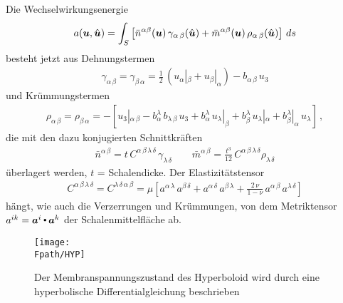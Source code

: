 Die Wechselwirkungsenergie
\begin{align}
a(\mbox{\boldmath $u$},\hat{\mbox{\boldmath $u$}}) = \int_{S} \left[\bar{n}^{\alpha \beta}(\mbox{\boldmath $u$})\,\gamma_{\alpha\,\beta}(\hat{\mbox{\boldmath $u$}}) + \bar{m}^{\alpha \beta}(\mbox{\boldmath $u$})\,\rho_{\alpha\,\beta}(\hat{\mbox{\boldmath $u$}})\right]\,ds
\end{align}
besteht jetzt aus Dehnungstermen
\begin{align}
\gamma_{\alpha\,\beta} = \gamma_{\beta\,\alpha} = \frac{1}{2}\, (u_{\alpha}|_\beta +
u_{\beta}|_\alpha) - b_{\alpha\,\beta}\,u_3
\end{align}
und Kr\"{u}mmungstermen
\begin{align}
\rho_{\alpha\,\beta} = \rho_{\beta\,\alpha} = - \left[u_3|_{\alpha\,\beta} -
b_\alpha^\lambda\,b_{\lambda\,\beta}\,u_3 + b_\alpha^\lambda\,u_\lambda|_\beta +
b_\beta^\lambda\,u_\lambda|_\alpha + b_\beta^\lambda|_\alpha\,u_\lambda\right]\,,
\end{align}
die mit den dazu konjugierten Schnittkr\"{a}ften
\begin{align}
\bar{n}^{\alpha\,\beta} = t\,C^{\alpha\,\beta\,\lambda\,\delta}
\,\gamma_{\lambda\,\delta} \qquad \bar{m}^{\alpha\,\beta} =
\frac{t^3}{12}\,C^{\alpha\,\beta\,\lambda\,\delta} \rho_{\lambda\,\delta}
\end{align}
\"{u}berlagert werden, $t$ = Schalendicke. Der Elastizit\"{a}tstensor
\begin{align}
C^{\alpha\,\beta\,\lambda\,\delta} = C^{\lambda\,\delta\,\alpha\,\beta} = \mu \left[
a^{\alpha\,\lambda}\,a^{\beta\,\delta} + a^{\alpha\,\delta}\,a^{\beta\,\lambda} +
\frac{2\,\nu}{1 - \nu} \,a^{\alpha\,\beta}\,a^{\lambda\,\delta}\right]
\end{align}
h\"{a}ngt, wie auch die Verzerrungen und Kr\"{u}mmungen, von dem Metriktensor $a^{ik} = \mbox{\boldmath $a$}^i{\,\scriptscriptstyle \stackrel{\bullet}{{}}}\, \mbox{\boldmath $a$}^k$ der Schalenmittelfl\"{a}che ab.
\begin{figure}[h]
\if {} \sidecaption \fi
\texttt{[image: \\Fpath/HYP]}
\caption{Der Membranspannungszustand des Hyperboloid  wird durch eine hyperbolische
Differentialgleichung beschrieben}\label{Hyp}
\end{figure}

